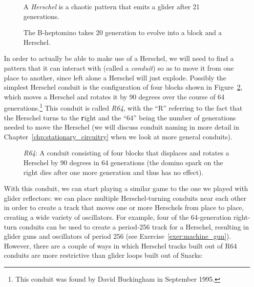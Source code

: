 \begin{figure}[!htb]
	\centering
	\begin{minipage}{.43\textwidth}
		\centering{}
		\caption{A \emph{Herschel} is a chaotic pattern that emits a glider after 21 generations.}\label{fig:herschel}
	\end{minipage} \hfill %
	\begin{minipage}{.53\textwidth}
		\centering{}
		\caption{The B-heptomino takes 20 generation to evolve into a block and a Herschel.}\label{fig:b_heptomino_to_herschel}
	\end{minipage}
\end{figure}

In order to actually be able to make use of a Herschel, we will need to find a pattern that it can interact with (called a \emph{conduit}) so as to move it from one place to another, since left alone a Herschel will just explode. Possibly the simplest Herschel conduit is the configuration of four blocks shown in Figure~\ref{fig:herschel_64}, which moves a Herschel and rotates it by 90 degrees over the course of 64 generations.\footnote{This conduit was found by David Buckingham in September 1995.} This conduit is called \emph{R64}, with the ``R'' referring to the fact that the Herschel turns to the \textbf{r}ight and the ``64'' being the number of generations needed to move the Herschel (we will discuss conduit naming in more detail in Chapter~\ref{chp:stationary_circuitry} when we look at more general conduits). 

\begin{figure}[!htb]
	\centering{}
	\caption{\emph{R64}: A conduit consisting of four blocks that displaces and rotates a Herschel by 90 degrees in 64 generations (the domino spark on the right dies after one more generation and thus has no effect).}\label{fig:herschel_64}
\end{figure}

With this conduit, we can start playing a similar game to the one we played with glider reflectors: we can place multiple Herschel-turning conduits near each other in order to create a track that moves one or more Herschels from place to place, creating a wide variety of oscillators. For example, four of the 64-generation right-turn conduits can be used to create a period-256 track for a Herschel, resulting in glider guns and oscillators of period 256 (see Exercise~\ref{exer:machine_gun}). However, there are a couple of ways in which Herschel tracks built out of R64 conduits are more restrictive than glider loops built out of Snarks:\medskip

